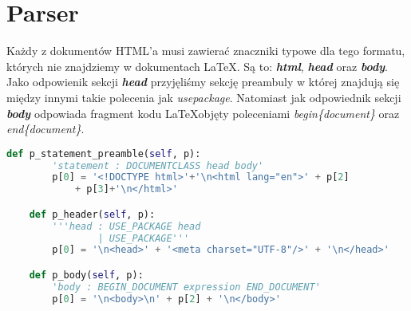 \section{Parser}

Każdy z dokumentów HTML'a musi zawierać znaczniki typowe dla tego formatu, których nie znajdziemy w dokumentach \LaTeX. Są to: \textbf{\textit{html}},
\textbf{\textit{head}} oraz \textbf{\textit{body}}. Jako odpowienik sekcji \textbf{\textit{head}} przyjęliśmy sekcję preambuly w której 
znajdują się między innymi takie polecenia jak \textit{usepackage}. Natomiast jak odpowiednik sekcji \textbf{\textit{body}} odpowiada fragment kodu 
\LaTeX \space objęty poleceniami \textit{begin\{document\}} oraz \textit{end\{document\}}.

\begin{lstlisting}[language={Python}, caption={Gramatyka - preambuła}, label={gramatyka-preamble}]
    def p_statement_preamble(self, p):
        'statement : DOCUMENTCLASS head body'
        p[0] = '<!DOCTYPE html>'+'\n<html lang="en">' + p[2] 
            + p[3]+'\n</html>'

    def p_header(self, p):
        '''head : USE_PACKAGE head
                | USE_PACKAGE'''
        p[0] = '\n<head>' + '<meta charset="UTF-8"/>' + '\n</head>'

    def p_body(self, p):
        'body : BEGIN_DOCUMENT expression END_DOCUMENT'
        p[0] = '\n<body>\n' + p[2] + '\n</body>'
\end{lstlisting}











